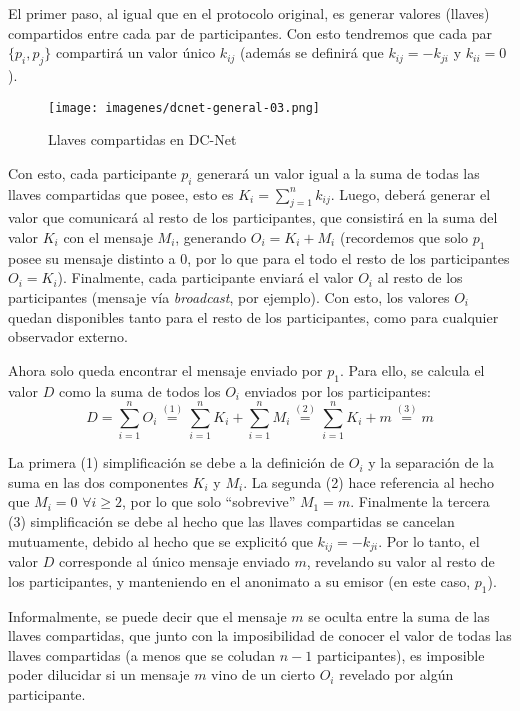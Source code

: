 El primer paso, al igual que en el protocolo original, es generar valores (llaves) compartidos entre cada par de participantes. Con esto 
tendremos que cada par $\{p_i, p_j\}$ compartirá un valor único $k_{ij}$ (además se definirá que $k_{ij} = -k_{ji}$ y $k_{ii} = 0$).

\begin{figure}[H]
  \centering
    \texttt{[image: imagenes/dcnet-general-03.png]}
  \caption{Llaves compartidas en DC-Net}
\end{figure}

Con esto, cada participante $p_i$ generará un valor igual a la suma de todas las llaves compartidas que posee, esto es $K_i = \sum_{j=1}^n k_{ij}$. 
Luego, deberá generar el valor que comunicará al resto de los participantes, que consistirá en la suma del valor $K_i$ con el mensaje $M_i$, 
generando $O_i = K_i + M_i$ (recordemos que solo $p_1$ posee su mensaje distinto a 0, por lo que para el todo el resto de los participantes $O_i = K_i$). 
Finalmente, cada participante enviará el valor $O_i$ al resto de los participantes (mensaje vía \emph{broadcast}, por ejemplo). Con esto, los 
valores $O_i$ quedan disponibles tanto para el resto de los participantes, como para cualquier observador externo.

Ahora solo queda encontrar el mensaje enviado por $p_1$. Para ello, se calcula el valor $D$ como la suma de todos los $O_i$ enviados por los 
participantes: $$D = \sum_{i=1}^n O_i \overset{(1)}{=} \sum_{i=1}^n K_i + \sum_{i=1}^n M_i \overset{(2)}{=} \sum_{i=1}^n K_i + m \overset{(3)}{=} m$$

La primera (1) simplificación se debe a la definición de $O_i$ y la separación de la suma en las dos componentes $K_i$ y $M_i$. La segunda 
(2) hace referencia al hecho que $M_i = 0$ $\forall i \geq 2$, por lo que solo ``sobrevive'' $M_1 = m$. Finalmente la tercera (3) simplificación 
se debe al hecho que las llaves compartidas se cancelan mutuamente, debido al hecho que se explicitó que $k_{ij} = -k_{ji}$. Por lo tanto, el 
valor $D$ corresponde al único mensaje enviado $m$, revelando su valor al resto de los participantes, y manteniendo en el anonimato a su emisor 
(en este caso, $p_1$).

Informalmente, se puede decir que el mensaje $m$ se oculta entre la suma de las llaves compartidas, que junto con la imposibilidad de conocer el 
valor de todas las llaves compartidas (a menos que se coludan $n-1$ participantes), es imposible poder dilucidar si un mensaje $m$ vino de un 
cierto $O_i$ revelado por algún participante.

